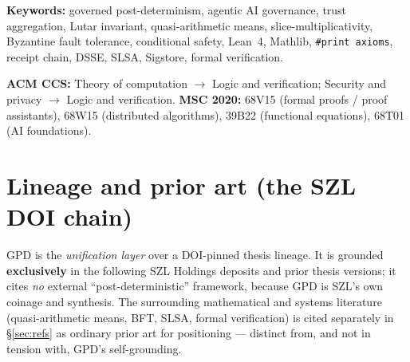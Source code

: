 \documentclass[11pt,letterpaper]{article}
\theoremstyle{definition}
\begin{document}
\noindent\textbf{Keywords:} governed post-determinism, agentic AI governance,
trust aggregation, Lutar invariant, quasi-arithmetic means,
slice-multiplicativity, Byzantine fault tolerance, conditional safety, Lean~4,
Mathlib, \texttt{\#print axioms}, receipt chain, DSSE, SLSA, Sigstore, formal
verification.

\medskip
\noindent\textbf{ACM CCS:} Theory of computation $\rightarrow$ Logic and
verification; Security and privacy $\rightarrow$ Logic and verification.
\quad\textbf{MSC 2020:} 68V15 (formal proofs / proof assistants), 68W15
(distributed algorithms), 39B22 (functional equations), 68T01 (AI foundations).

\tableofcontents

\section*{Lineage and prior art (the SZL DOI chain)}

GPD is the \emph{unification layer} over a DOI-pinned thesis lineage. It is
grounded \textbf{exclusively} in the following SZL Holdings deposits and prior
thesis versions; it cites \emph{no} external ``post-deterministic'' framework,
because GPD is SZL's own coinage and synthesis. The surrounding mathematical and
systems literature (quasi-arithmetic means, BFT, SLSA, formal verification) is
cited separately in \S\ref{sec:refs} as ordinary prior art for positioning ---
distinct from, and not in tension with, GPD's self-grounding.
\end{document}
